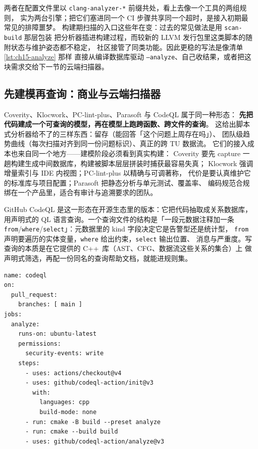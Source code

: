 \documentclass[12pt,a4paper,fontset=fandol]{ctexbook}
\newcommand{\Bk}{\discretionary{}{}{}}
\newcommand{\Lang}[1]{\textsf{#1}}
\newcommand{\CPP}{\Lang{C++}}
\begin{document}
两者在配置文件里以 \texttt{clang-analyzer-*} 前缀共处，看上去像一个工具的两组规则，
实为两台引擎；把它们塞进同一个 CI 步骤共享同一个超时，是接入初期最常见的排障噩梦。
构建期扫描的入口这些年在变：过去的常见做法是用 \texttt{scan-build} 那层包装
把分析器插进构建过程，而较新的 LLVM 发行包里这类脚本的随附状态与维护姿态都不稳定，
社区接管了同类功能。因此更稳的写法是像清单 \ref{lst:ch15-analyze} 那样
直接从编译数据库驱动 \texttt{--analyze}、自己收结果，或者把这块需求交给下一节的云端扫描器。

\subsection*{先建模再查询：商业与云端扫描器}

Coverity、Klocwork、PC-lint-plus、Parasoft 与 CodeQL 属于同一种形态：
\textbf{先把代码建成一个可查询的模型，再在模型上跑跨函数、跨文件的查询}。
这给出脚本式分析器给不了的三样东西：留存（能回答「这个问题上周存在吗」）、
团队级趋势曲线（每次扫描对齐到同一份问题标识）、真正的跨 TU 数据流。
它们的接入成本也来自同一个地方——建模阶段必须看到真实构建：
Coverity 要先 capture 一趟构建生成中间数据库，构建被脚本层层拼装时捕获最容易失真；
Klocwork 强调增量索引与 IDE 内视图；PC-lint-plus 以精确与可调著称，
代价是要认真维护它的标准库与项目配置；Parasoft 把静态分析与单元测试、覆盖率、
编码规范合规绑在一个产品里，适合有审计与追溯要求的团队。

GitHub CodeQL 是这一形态在开源生态里的版本：它把代码抽取成关系数据库，
用声明式的 QL 语言查询。一个查询文件的结构是「一段元数据注释加一条
\texttt{from}/{\Bk}\texttt{where}/{\Bk}\texttt{select}」：元数据里的 kind 字段决定它是告警型还是统计型，
\texttt{from} 声明要遍历的实体变量，\texttt{where} 给出约束，\texttt{select} 输出位置、
消息与严重度。写查询的本质是在它提供的 \CPP\ 库（AST、CFG、数据流这些关系的集合）上
做声明式筛选，再配一份同名的查询帮助文档，就能进规则集。

\begin{lstlisting}[style=yamlstyle,caption={Actions 里的 CodeQL 作业：构建由自己跑},label={lst:ch15-codeql}]
name: codeql
on:
  pull_request:
    branches: [ main ]
jobs:
  analyze:
    runs-on: ubuntu-latest
    permissions:
      security-events: write
    steps:
      - uses: actions/checkout@v4
      - uses: github/codeql-action/init@v3
        with:
          languages: cpp
          build-mode: none
      - run: cmake -B build --preset analyze
      - run: cmake --build build
      - uses: github/codeql-action/analyze@v3
\end{lstlisting}
\end{document}
